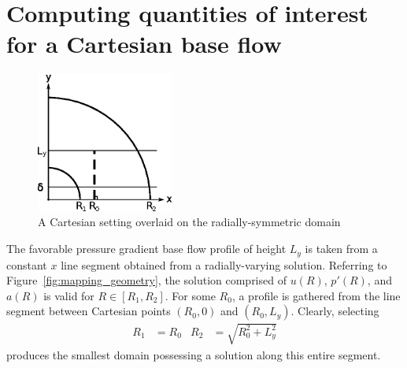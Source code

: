 \documentclass[letterpaper,11pt,nointlimits,reqno]{amsart}
\begin{document}
\clearpage

\section{Computing quantities of interest for a Cartesian base flow}

\begin{figure}[h]
  \centering
  \includegraphics[width=0.40\textwidth]{nozzle_schematic}
  \caption{
      \label{fig:mapping_geometry}
      A Cartesian setting overlaid on the radially-symmetric domain
  }
\end{figure}

The favorable pressure gradient base flow profile of height $L_y$ is taken from
a constant $x$ line segment obtained from a radially-varying solution.
Referring to Figure~\eqref{fig:mapping_geometry}, the solution comprised of
$u\!\left(R\right)$, $p'\!\left(R\right)$, and $a\!\left(R\right)$ is valid for
$R\in\left[R_1,R_2\right]$.  For some $R_0$, a profile is gathered from the
line segment between Cartesian points $\left(R_0,0\right)$ and
$\left(R_0,L_y\right)$.  Clearly, selecting
\begin{align}
  R_1 &= R_0
&
  R_2 &= \sqrt{R_0^2 + L_y^2}
\end{align}
produces the smallest domain possessing a solution along this entire segment.
\end{document}
